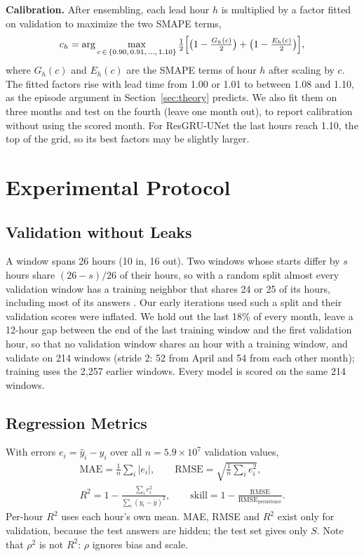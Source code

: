 \documentclass[journal]{IEEEtran}
\begin{document}
\textbf{Calibration.} After ensembling, each lead hour $h$ is multiplied by a factor fitted on validation to maximize the two SMAPE terms,
\begin{equation}
c_h = \arg\max_{c\,\in\,\{0.90,\,0.91,\,\dots,\,1.10\}} \tfrac12\Bigl[\bigl(1-\tfrac{G_h(c)}{2}\bigr) + \bigl(1-\tfrac{E_h(c)}{2}\bigr)\Bigr],
\end{equation}
where $G_h(c)$ and $E_h(c)$ are the SMAPE terms of hour $h$ after scaling by $c$. The fitted factors rise with lead time from 1.00 or 1.01 to between 1.08 and 1.10, as the episode argument in Section~\ref{sec:theory} predicts. We also fit them on three months and test on the fourth (leave one month out), to report calibration without using the scored month. For ResGRU-UNet the last hours reach 1.10, the top of the grid, so its best factors may be slightly larger.

\section{Experimental Protocol}
\label{sec:setup}
\subsection{Validation without Leaks}
A window spans 26 hours (10 in, 16 out). Two windows whose starts differ by $s$ hours share $(26-s)/26$ of their hours, so with a random split almost every validation window has a training neighbor that shares 24 or 25 of its hours, including most of its answers \cite{roberts2017}. Our early iterations used such a split and their validation scores were inflated. We hold out the last 18\% of every month, leave a 12-hour gap between the end of the last training window and the first validation hour, so that no validation window shares an hour with a training window, and validate on 214 windows (stride 2: 52 from April and 54 from each other month); training uses the 2{,}257 earlier windows. Every model is scored on the same 214 windows.

\subsection{Regression Metrics}
With errors $e_i=\hat{y}_i-y_i$ over all $n = 5.9\times10^7$ validation values,
\begin{gather}
\mathrm{MAE}=\tfrac1n\textstyle\sum_i|e_i|, \qquad \mathrm{RMSE}=\sqrt{\tfrac1n\textstyle\sum_i e_i^2}, \\
R^2 = 1-\frac{\sum_i e_i^2}{\sum_i (y_i-\bar{y})^2}, \qquad \text{skill} = 1-\frac{\mathrm{RMSE}}{\mathrm{RMSE}_{\text{persistence}}}.
\end{gather}
Per-hour $R^2$ uses each hour's own mean. MAE, RMSE and $R^2$ exist only for validation, because the test answers are hidden; the test set gives only $S$. Note that $\rho^2$ is not $R^2$: $\rho$ ignores bias and scale.
\end{document}
